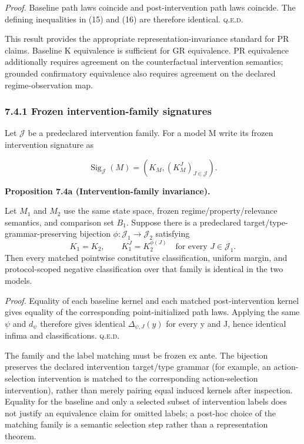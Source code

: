 \documentclass[10pt]{article}
\begin{document}
\emph{Proof.} Baseline path laws coincide and post-intervention path
laws coincide. The defining inequalities in (15) and (16) are therefore
identical. \hfill\textsc{q.e.d.}

This result provides the appropriate representation-invariance standard
for PR claims. Baseline K equivalence is sufficient for GR equivalence.
PR equivalence additionally requires agreement on the counterfactual
intervention semantics; grounded confirmatory equivalence also requires
agreement on the declared regime-observation map.


\subsubsection{7.4.1 Frozen intervention-family signatures}\label{frozen-intervention-family-signatures}

Let \(\mathcal J\) be a predeclared intervention family. For a model M write its frozen intervention signature as

\begin{equation}
\operatorname{Sig}_{\mathcal J}(M)=\left(K_M,(K_M^J)_{J\in\mathcal J}\right).
\tag{18a}\label{eq:18a}
\end{equation}

\textbf{Proposition 7.4a (Intervention-family invariance).}\par\noindent Let \(M_1\) and \(M_2\) use the same state space, frozen regime/property/relevance semantics, and comparison set \(B_1\). Suppose there is a predeclared target/type-grammar-preserving bijection \(\phi:\mathcal J_1\to\mathcal J_2\) satisfying
\[
K_1=K_2,\qquad K_1^J=K_2^{\phi(J)}\quad\text{for every }J\in\mathcal J_1.
\]
Then every matched pointwise constitutive classification, uniform margin, and protocol-scoped negative classification over that family is identical in the two models.

\emph{Proof.} Equality of each baseline kernel and each matched post-intervention kernel gives equality of the corresponding point-initialized path laws. Applying the same \(\psi\) and \(d_\psi\) therefore gives identical \(\Delta_{\psi,J}(y)\) for every y and J, hence identical infima and classifications. \hfill\textsc{q.e.d.}

The family and the label matching must be frozen ex ante. The bijection preserves the declared intervention target/type grammar (for example, an action-selection intervention is matched to the corresponding action-selection intervention), rather than merely pairing equal induced kernels after inspection. Equality for the baseline and only a selected subset of intervention labels does not justify an equivalence claim for omitted labels; a post-hoc choice of the matching family is a semantic selection step rather than a representation theorem.
\end{document}
